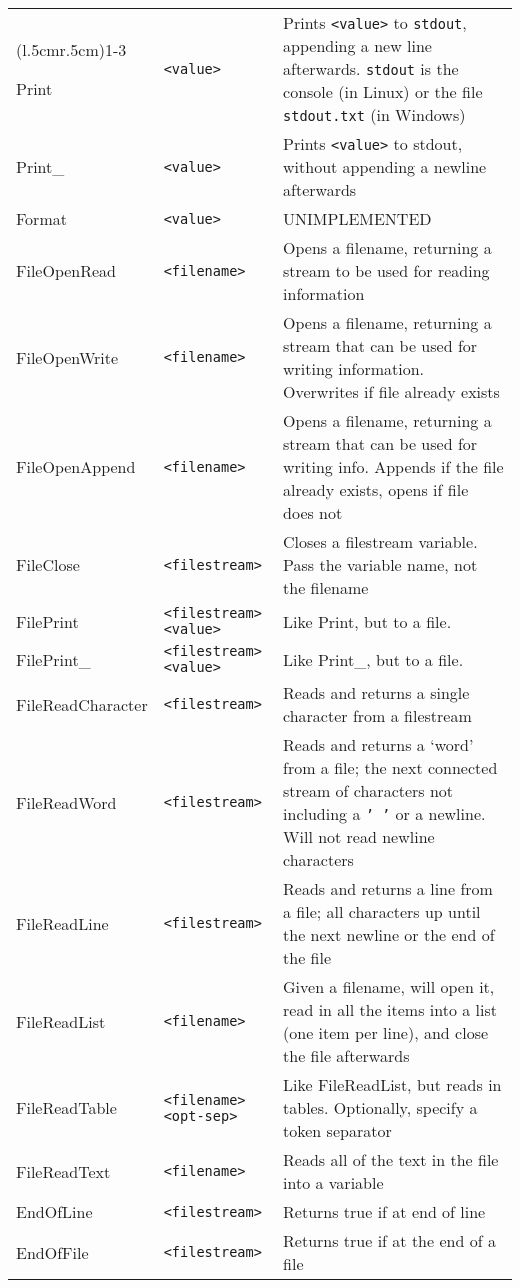 \begin{longtable}{p{3cm}p{3cm}p{6cm}}
\addlinespace[0.2cm]
\midrule
\multicolumn{3}{c}{\textbf{File/Stream Functions}}\\
\cmidrule(l{.5cm}r{.5cm}){1-3}

Print          &\verb+<value>+ &Prints \verb+<value>+ to \texttt{stdout}, appending a new line afterwards.  \texttt{stdout} is the console (in Linux) or the file \texttt{stdout.txt} (in Windows)\\
Print\_        &\verb+<value>+ &Prints \verb+<value>+ to stdout,  without appending a newline afterwards\\
Format         &\verb+<value>+ &   	UNIMPLEMENTED \\
FileOpenRead   &\verb+<filename>+  &Opens a filename, returning  a stream to be  used for reading information\\
FileOpenWrite  &\verb+<filename>+  &Opens a filename, returning a stream that can be used for writing information. Overwrites if file already exists\\
FileOpenAppend &\verb+<filename>+  &Opens a filename, returning a stream that can be used for writing info.  Appends if the file already exists, opens if file does not\\
FileClose      &\verb+<filestream>+&Closes a filestream  variable. Pass the variable name, not the filename\\
FilePrint      &\verb+<filestream>+ \verb+<value>+ &Like Print, but to a file.\\
FilePrint\_    &\verb+<filestream>+ \verb+<value>+ &Like Print\_, but to a file.\\
FileReadCharacter&\verb+<filestream>+       &Reads and returns a single character from a filestream\\
FileReadWord   &\verb+<filestream>+&Reads and returns a `word' from a file;  the next connected stream of characters not including a \texttt{' '} or a newline. Will not read newline characters\\ 
FileReadLine   &\verb+<filestream>+&Reads and returns a line from a file; all characters up until the next newline or the end of the file\\
FileReadList   &\verb+<filename>+  &Given a filename, will open it, read in all the items into a list (one item per line), and close the file afterwards\\
FileReadTable  &\verb+<filename>+ \verb+<opt-sep>+ &Like FileReadList, but reads in tables. Optionally, specify a token separator\\
FileReadText   &\verb+<filename>+  &Reads all of the text in the file into a variable\\
EndOfLine      &\verb+<filestream>+&Returns true if at end of line \\
EndOfFile      &\verb+<filestream>+&Returns true if at the end of a file\\




\end{longtable}
